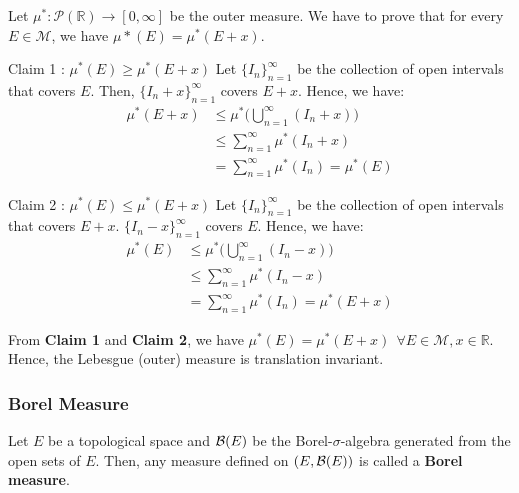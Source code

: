 \begin{proof*}
    Let $\mu^*:\mathcal{P}(\mathbb{R}) \to [0,\infty]$ be the outer measure. We have to prove that for every $E \in \mathcal{M}$, we have $\mu*(E)=\mu^*(E+x)$.

    \begin{subproof}{\newline Claim 1 : $\mu^*(E) \ge \mu^*(E+x)$}
        Let $\{I_n\}_{n=1}^\infty$ be the collection of open intervals that covers $E$. Then, $\{I_n+x\}_{n=1}^\infty$ covers $E+x$. Hence, we have:
        \begin{align*}
            \mu^*(E+x) &\le \mu^*\Bigg( \bigcup_{n=1}^\infty (I_n+x) \Bigg) \\
            &\le \sum_{n=1}^\infty \mu^*(I_n+x) \\
            &= \sum_{n=1}^\infty \mu^*(I_n) = \mu^*(E)
        \end{align*}
    \end{subproof}

    \begin{subproof}{\newline Claim 2 : $\mu^*(E) \le \mu^*(E+x)$}
        Let $\{I_n\}_{n=1}^\infty$ be the collection of open intervals that covers $E+x$. $\{I_n-x\}_{n=1}^\infty$ covers $E$. Hence, we have:
        \begin{align*}
            \mu^*(E) &\le \mu^*\Bigg( \bigcup_{n=1}^\infty (I_n-x) \Bigg) \\
            &\le \sum_{n=1}^\infty \mu^*(I_n-x) \\
            &= \sum_{n=1}^\infty \mu^*(I_n) = \mu^*(E+x)
        \end{align*}
    \end{subproof}

    \noindent From \textbf{Claim 1} and \textbf{Claim 2}, we have $\mu^*(E) = \mu^*(E+x) \ \ \forall E\in\mathcal{M}, x\in\mathbb{R}$. Hence, the Lebesgue (outer) measure is translation invariant.
\end{proof*}

\subsubsection{Borel Measure}
\begin{definition}
    Let $E$ be a topological space and $\borel[E]$ be the Borel-$\sigma$-algebra generated from the open sets of $E$. Then, any measure defined on $(E, \borel[E])$ is called a \textbf{Borel measure}.
\end{definition}

